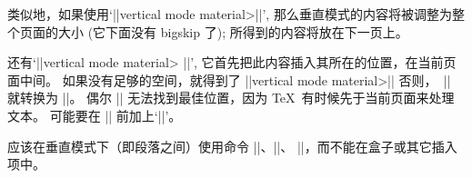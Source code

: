 \danger 类似地，如果使用`|\pageinsert|\stretch\<vertical mode
material>\stretch |\endinsert|', 那么垂直模式的内容将被调整为整个页面的大小%
(它下面没有 bigskip 了);
所得到的内容将放在下一页上。

\danger \1还有`|\midinsert|\stretch\<vertical mode material>\stretch
|\endinsert|', 它首先把此内容插入其所在的位置，在当前页面中间。%
如果没有足够的空间，就得到了
\begindisplay
|\bigskip\vbox{|\<vertical mode material>|}\bigbreak|
\enddisplay
否则，~|\midinsert| 就转换为 |\topinsert|。%
偶尔 |\midinsert| 无法找到最佳位置，因为 \TeX\ 有时候先于当前页面来处理文本。%
可能要在 |\midinsert| 前加上`|\goodbreak|'。

\danger 应该在垂直模式下（即段落之间）使用命令 |\topinsert|、|\pageinsert|、
|\midinsert|，而不能在盒子或其它插入项中。

